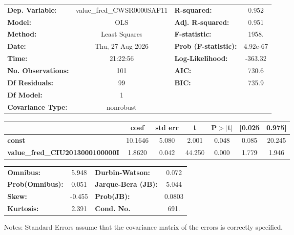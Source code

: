 \begin{center}
\begin{tabular}{lclc}
\toprule
\textbf{Dep. Variable:}                 & value\_fred\_CWSR0000SAF11 & \textbf{  R-squared:         } &     0.952   \\
\textbf{Model:}                         &            OLS             & \textbf{  Adj. R-squared:    } &     0.951   \\
\textbf{Method:}                        &       Least Squares        & \textbf{  F-statistic:       } &     1958.   \\
\textbf{Date:}                          &      Thu, 27 Aug 2026      & \textbf{  Prob (F-statistic):} &  4.92e-67   \\
\textbf{Time:}                          &          21:22:56          & \textbf{  Log-Likelihood:    } &   -363.32   \\
\textbf{No. Observations:}              &              101           & \textbf{  AIC:               } &     730.6   \\
\textbf{Df Residuals:}                  &               99           & \textbf{  BIC:               } &     735.9   \\
\textbf{Df Model:}                      &                1           & \textbf{                     } &             \\
\textbf{Covariance Type:}               &         nonrobust          & \textbf{                     } &             \\
\bottomrule
\end{tabular}
\begin{tabular}{lcccccc}
                                        & \textbf{coef} & \textbf{std err} & \textbf{t} & \textbf{P$> |$t$|$} & \textbf{[0.025} & \textbf{0.975]}  \\
\midrule
\textbf{const}                          &      10.1646  &        5.080     &     2.001  &         0.048        &        0.085    &       20.245     \\
\textbf{value\_fred\_CIU2013000100000I} &       1.8620  &        0.042     &    44.250  &         0.000        &        1.779    &        1.946     \\
\bottomrule
\end{tabular}
\begin{tabular}{lclc}
\textbf{Omnibus:}       &  5.948 & \textbf{  Durbin-Watson:     } &    0.072  \\
\textbf{Prob(Omnibus):} &  0.051 & \textbf{  Jarque-Bera (JB):  } &    5.044  \\
\textbf{Skew:}          & -0.455 & \textbf{  Prob(JB):          } &   0.0803  \\
\textbf{Kurtosis:}      &  2.391 & \textbf{  Cond. No.          } &     691.  \\
\bottomrule
\end{tabular}
\end{center}

Notes: \newline
 [1] Standard Errors assume that the covariance matrix of the errors is correctly specified.